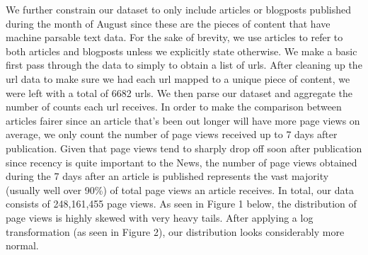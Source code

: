 \documentclass[fleqn,12pt]{SelfArx} %
\begin{document}
We further constrain our dataset to only include articles or blogposts published during the month of August since these are the pieces of content that have machine parsable text data. For the sake of brevity, we use articles to refer to both articles and blogposts unless we explicitly state otherwise. We make a basic first pass through the data to simply to obtain a list of urls. After cleaning up the url data to make sure we had each url mapped to a unique piece of content, we were left with a total of 6682 urls. We then parse our dataset and aggregate the number of counts each url receives. In order to make the comparison between articles fairer since an article that's been out longer will have more page views on average, we only count the number of page views received up to 7 days after publication. Given that page views tend to sharply drop off soon after publication since recency is quite important to the News, the number of page views obtained during the 7 days after an article is published represents the vast majority (usually well over 90\%) of total page views an article receives. In total, our data consists of 248,161,455 page views. As seen in Figure 1 below, the distribution of page views is highly skewed with very heavy tails. After applying a log transformation (as seen in Figure 2), our distribution looks considerably more normal. 
\end{document}
